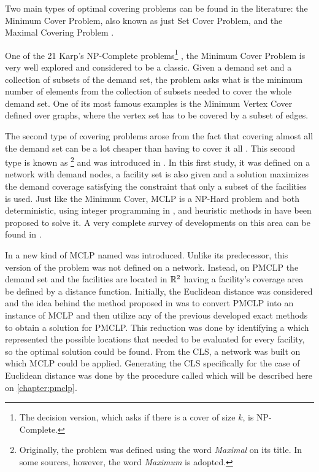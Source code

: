 Two main types of optimal covering problems can be found in the literature: the Minimum Cover Problem, also known as just Set Cover Problem, and the Maximal Covering Problem \cite{karatas}. 

One of the 21 Karp's NP-Complete problems\footnote{The decision version, which asks if there is a cover of size $k$, is NP-Complete.} \cite{karp}, the Minimum Cover Problem is very well explored and considered to be a classic. 
Given a demand set and a collection of subsets of the demand set, the problem asks what is the minimum number of elements from the collection of subsets needed to cover the whole demand set. One of its most famous examples is the Minimum Vertex Cover defined over graphs, where the vertex set has to be covered by a subset of edges.

The second type of covering problems arose from the fact that covering almost all the demand set can be a lot cheaper than having to cover it all \cite{garcia}. This second type is known as \footnote{Originally, the problem was defined using the word \textit{Maximal} on its title. In some sources, however, the word \textit{Maximum} is adopted.} and was introduced in . In this first study, it was defined on a network with demand nodes, a facility set is also given and a solution maximizes the demand coverage satisfying the constraint that only a subset of the facilities is used. Just like the Minimum Cover, MCLP is a NP-Hard problem \cite{hatta:2013} and both deterministic, using integer programming in , and heuristic methods in  have been proposed to solve it. A very complete survey of developments on this area can be found in .

In  a new kind of MCLP named  was introduced. Unlike its predecessor, this version of the problem was not defined on a network. Instead, on PMCLP the demand set and the facilities are located in $\mathbb{R}^2$ having a facility's coverage area be defined by a distance function. 
Initially, the Euclidean distance was considered and the idea behind the method proposed in  was to convert PMCLP into an instance of MCLP and then utilize any of the previous developed exact methods to obtain a solution for PMCLP. This reduction was done by identifying a  which represented the possible locations that needed to be evaluated for every facility, so the optimal solution could be found. From the CLS, a network was built on which MCLP could be applied. Generating the CLS specifically for the case of Euclidean distance was done by the procedure called  which will be described here on \autoref{chapter:pmclp}.

